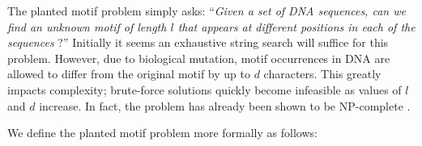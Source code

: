 \documentclass[conference]{IEEEtran}
\begin{document}
	\noindent

	The planted motif problem simply asks: ``\emph{Given a set of DNA sequences, can we find an unknown motif of length $l$ that appears at different positions in each of the sequences} \cite{pevzner2000combinatorial}?'' Initially it seems an exhaustive string search will suffice for this problem. However, due to biological mutation, motif occurrences in DNA are allowed to differ from the original motif by up to $d$ characters. This greatly impacts complexity; brute-force solutions quickly become infeasible as values of $l$ and $d$ increase. In fact, the problem has already been shown to be NP-complete \cite{pms2014}. 

	\noindent We define the planted motif problem more formally as follows:

	\noindent
\end{document}
